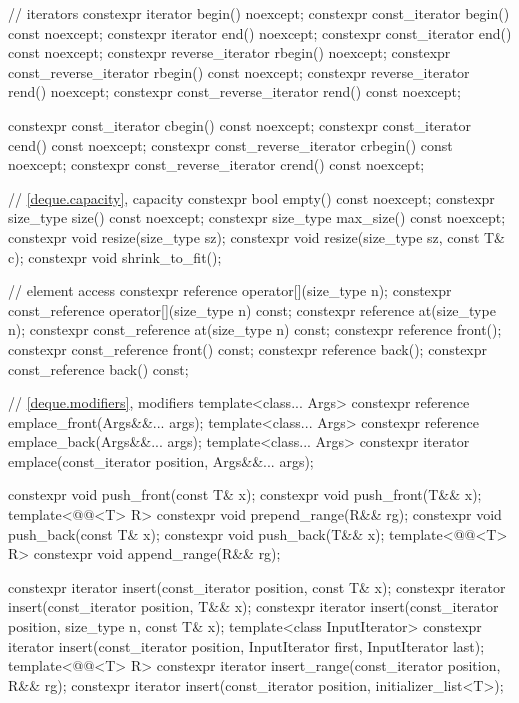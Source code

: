 \begin{codeblock}
{{    // iterators
    constexpr iterator               begin() noexcept;
    constexpr const_iterator         begin() const noexcept;
    constexpr iterator               end() noexcept;
    constexpr const_iterator         end() const noexcept;
    constexpr reverse_iterator       rbegin() noexcept;
    constexpr const_reverse_iterator rbegin() const noexcept;
    constexpr reverse_iterator       rend() noexcept;
    constexpr const_reverse_iterator rend() const noexcept;

    constexpr const_iterator         cbegin() const noexcept;
    constexpr const_iterator         cend() const noexcept;
    constexpr const_reverse_iterator crbegin() const noexcept;
    constexpr const_reverse_iterator crend() const noexcept;

    // \ref{deque.capacity}, capacity
    constexpr bool empty() const noexcept;
    constexpr size_type size() const noexcept;
    constexpr size_type max_size() const noexcept;
    constexpr void      resize(size_type sz);
    constexpr void      resize(size_type sz, const T& c);
    constexpr void      shrink_to_fit();

    // element access
    constexpr reference       operator[](size_type n);
    constexpr const_reference operator[](size_type n) const;
    constexpr reference       at(size_type n);
    constexpr const_reference at(size_type n) const;
    constexpr reference       front();
    constexpr const_reference front() const;
    constexpr reference       back();
    constexpr const_reference back() const;

    // \ref{deque.modifiers}, modifiers
    template<class... Args> constexpr reference emplace_front(Args&&... args);
    template<class... Args> constexpr reference emplace_back(Args&&... args);
    template<class... Args> constexpr iterator emplace(const_iterator position, Args&&... args);

    constexpr void push_front(const T& x);
    constexpr void push_front(T&& x);
    template<@@<T> R>
      constexpr void prepend_range(R&& rg);
    constexpr void push_back(const T& x);
    constexpr void push_back(T&& x);
    template<@@<T> R>
      constexpr void append_range(R&& rg);

    constexpr iterator insert(const_iterator position, const T& x);
    constexpr iterator insert(const_iterator position, T&& x);
    constexpr iterator insert(const_iterator position, size_type n, const T& x);
    template<class InputIterator>
      constexpr iterator insert(const_iterator position,
                                InputIterator first, InputIterator last);
    template<@@<T> R>
      constexpr iterator insert_range(const_iterator position, R&& rg);
    constexpr iterator insert(const_iterator position, initializer_list<T>);

}}
\end{codeblock}
